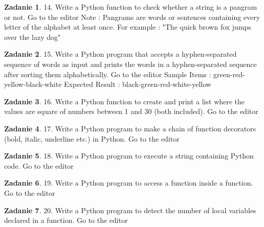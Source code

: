 \documentclass[11pt]{article}
\theoremstyle{definition}
\newtheorem{zadanie}{Zadanie}
\begin{document}
\begin{zadanie}
14. Write a Python function to check whether a string is a pangram or not. Go to the editor
Note : Pangrams are words or sentences containing every letter of the alphabet at least once.
For example : "The quick brown fox jumps over the lazy dog"
\end{zadanie}

\begin{zadanie}
15. Write a Python program that accepts a hyphen-separated sequence of words as input and prints the words in a hyphen-separated sequence after sorting them alphabetically. Go to the editor
Sample Items : green-red-yellow-black-white
Expected Result : black-green-red-white-yellow
\end{zadanie}

\begin{zadanie}
16. Write a Python function to create and print a list where the values are square of numbers between 1 and 30 (both included). Go to the editor
\end{zadanie}

\begin{zadanie}
17. Write a Python program to make a chain of function decorators (bold, italic, underline etc.) in Python. Go to the editor
\end{zadanie}

\begin{zadanie}
18. Write a Python program to execute a string containing Python code. Go to the editor
\end{zadanie}

\begin{zadanie}
19. Write a Python program to access a function inside a function. Go to the editor
\end{zadanie}

\begin{zadanie}
20. Write a Python program to detect the number of local variables declared in a function. Go to the editor
\end{zadanie}
\end{document}

